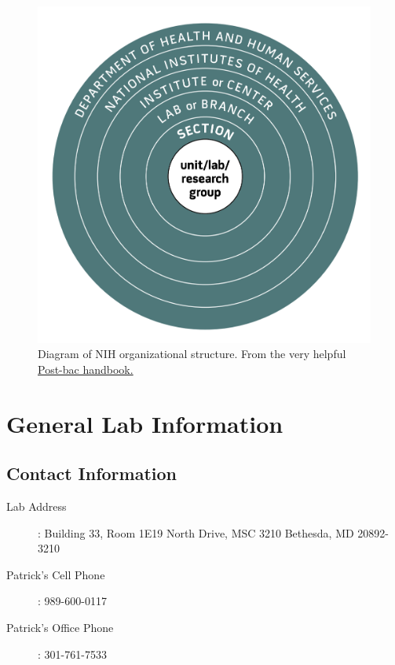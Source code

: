 \documentclass[10pt, letterpaper, twocolumn]{article} %
\begin{document}
\begin{figure}
	\includegraphics[width=\linewidth]{unitlab.png} %
	\caption{Diagram of NIH organizational structure. From the very helpful \href{https://www.training.nih.gov/assets/2019_Postbac_Handbook_Accessible.pdf}{Post-bac handbook.}} %
	\label{unit_organization} %
\end{figure}

\section{General Lab Information}
\subsection{Contact Information}
\begin{description}
\item [Lab Address]: \newline Building 33, Room 1E19  North Drive, MSC 3210 \newline Bethesda, MD 20892-3210
\item [Patrick's Cell Phone]: 989-600-0117
\item [Patrick's Office Phone]: 301-761-7533
\end{description}
\end{document}
